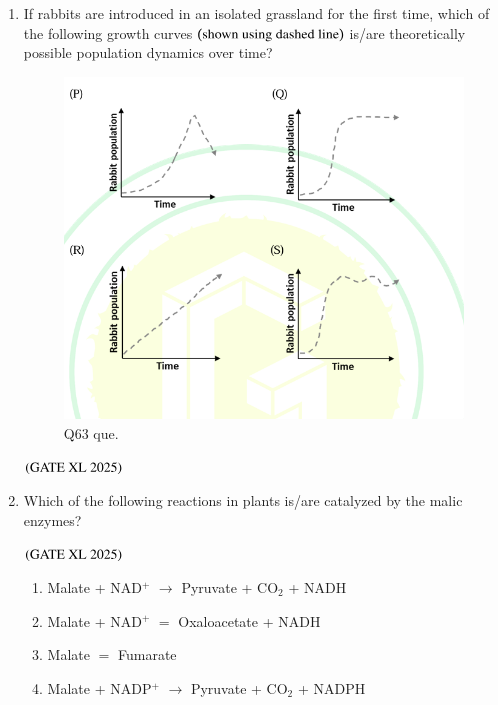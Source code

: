 \documentclass[journal]{IEEEtran}
\begin{document}
\begin{enumerate}
    \item If rabbits are introduced in an isolated grassland for the first time, which of the following growth curves $\left(\text{shown using dashed line}\right)$ is/are theoretically possible population dynamics over time?
    \begin{figure}[H]
        \centering
        \includegraphics[width=0.8\columnwidth]{figs/xl2025_q63.png}
        \caption{Q63 que.}
    \end{figure}
    \hfill $\left(\text{GATE XL 2025}\right)$
    \begin{enumerate}
    \end{enumerate}

    \item Which of the following reactions in plants is/are catalyzed by the malic enzymes?

    \hfill $\left(\text{GATE XL 2025}\right)$
    \begin{enumerate}
        \item Malate + NAD$^+$ $\rightarrow$ Pyruvate + CO$_2$ + NADH
        \item Malate + NAD$^+$ $=$ Oxaloacetate + NADH
        \item Malate $=$ Fumarate
        \item Malate + NADP$^+$ $\rightarrow$ Pyruvate + CO$_2$ + NADPH
    \end{enumerate}


\end{enumerate}
\end{document}
